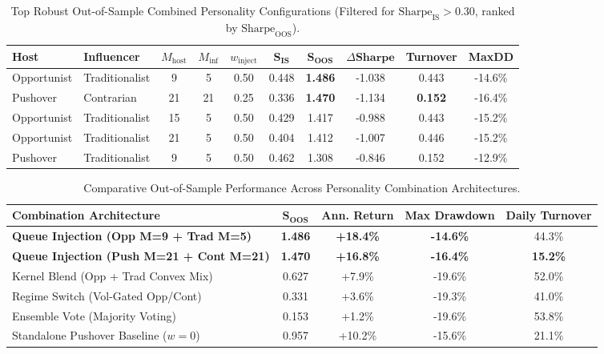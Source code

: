 \documentclass[11pt,a4paper]{article}
\begin{document}
\begin{table}[htbp]
\centering
\small
\caption{Top Robust Out-of-Sample Combined Personality Configurations (Filtered for $\text{Sharpe}_{\text{IS}} > 0.30$, ranked by $\text{Sharpe}_{\text{OOS}}$).}
\label{tab:top_robust}
\begin{tabular}{llccccc ccc}
\toprule
\textbf{Host} & \textbf{Influencer} & $M_{\text{host}}$ & $M_{\text{inf}}$ & $w_{\text{inject}}$ & $\mathbf{S_{\text{IS}}}$ & $\mathbf{S_{\text{OOS}}}$ & $\Delta \mathbf{Sharpe}$ & \textbf{Turnover} & \textbf{MaxDD} \\
\midrule
Opportunist & Traditionalist & 9 & 5 & 0.50 & 0.448 & \textbf{1.486} & -1.038 & 0.443 & -14.6\% \\
Pushover & Contrarian & 21 & 21 & 0.25 & 0.336 & \textbf{1.470} & -1.134 & \textbf{0.152} & -16.4\% \\
Opportunist & Traditionalist & 15 & 5 & 0.50 & 0.429 & 1.417 & -0.988 & 0.443 & -15.2\% \\
Opportunist & Traditionalist & 21 & 5 & 0.50 & 0.404 & 1.412 & -1.007 & 0.446 & -15.2\% \\
Pushover & Traditionalist & 9 & 5 & 0.50 & 0.462 & 1.308 & -0.846 & 0.152 & -12.9\% \\
\bottomrule
\end{tabular}
\end{table}

\begin{table}[htbp]
\centering
\small
\caption{Comparative Out-of-Sample Performance Across Personality Combination Architectures.}
\label{tab:combination_architectures}
\begin{tabular}{lcccc}
\toprule
\textbf{Combination Architecture} & $\mathbf{S_{\text{OOS}}}$ & \textbf{Ann. Return} & \textbf{Max Drawdown} & \textbf{Daily Turnover} \\
\midrule
\textbf{Queue Injection (Opp M=9 + Trad M=5)} & \textbf{1.486} & \textbf{+18.4\%} & \textbf{-14.6\%} & 44.3\% \\
\textbf{Queue Injection (Push M=21 + Cont M=21)} & \textbf{1.470} & \textbf{+16.8\%} & \textbf{-16.4\%} & \textbf{15.2\%} \\
Kernel Blend (Opp + Trad Convex Mix) & 0.627 & +7.9\% & -19.6\% & 52.0\% \\
Regime Switch (Vol-Gated Opp/Cont) & 0.331 & +3.6\% & -19.3\% & 41.0\% \\
Ensemble Vote (Majority Voting) & 0.153 & +1.2\% & -19.6\% & 53.8\% \\
Standalone Pushover Baseline ($w=0$) & 0.957 & +10.2\% & -15.6\% & 21.1\% \\
\bottomrule
\end{tabular}
\end{table}
\end{document}
